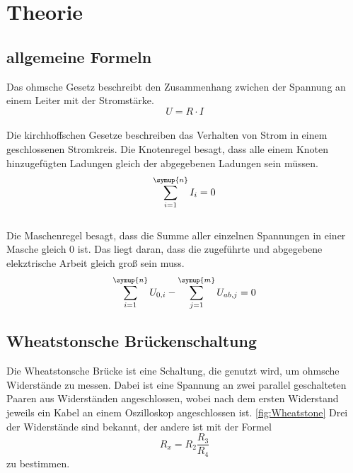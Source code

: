 \section{Theorie}
\label{sec:Theorie}
    \subsection{allgemeine Formeln}
    Das ohmsche Gesetz beschreibt den Zusammenhang zwichen der Spannung an einem Leiter mit der Stromstärke.
    \begin{equation}
        U=R \cdot I
        \label{eqn:ohm}
    \end{equation}\\
    Die kirchhoffschen Gesetze beschreiben das Verhalten von Strom in einem geschlossenen Stromkreis.
    Die Knotenregel besagt, dass alle einem Knoten hinzugefügten Ladungen gleich der abgegebenen Ladungen sein müssen.
    \begin{equation}
        \sum_{i=1}^{\symup{n}}{I_i}=0
        \label{eqn:knoten}
    \end{equation}\\
    Die Maschenregel besagt, dass die Summe aller einzelnen Spannungen in einer Masche gleich 0 ist. 
    Das liegt daran, dass die zugeführte und abgegebene elekztrische Arbeit gleich groß sein muss.
    \begin{equation}
        \sum_{i=1}^{\symup{n}}{U_{0,i}} - \sum_{j=1}^{\symup{m}}{U_{ab,j}} =0
        \label{eqn:masche}
    \end{equation}

    \subsection{Wheatstonsche Brückenschaltung}
    Die Wheatstonsche Brücke ist eine Schaltung, die genutzt wird, um ohmsche Widerstände zu messen.
    Dabei ist eine Spannung an zwei parallel geschalteten Paaren aus Widerständen angeschlossen, wobei nach dem ersten Widerstand jeweils ein Kabel an einem Oszilloskop angeschlossen ist.
    \ref{fig:Wheatstone}
    Drei der Widerstände sind bekannt, der andere ist mit der Formel
    \begin{equation}
        R_x=R_2 \frac{R_3}{R_4}
        \label{eqn:widerstand}
    \end{equation}
    zu bestimmen.

